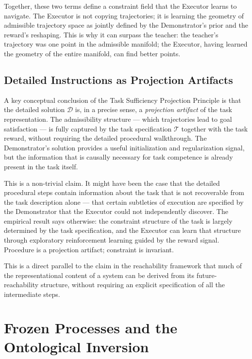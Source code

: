 \documentclass[12pt, a4paper]{article}
\theoremstyle{plain}
\theoremstyle{definition}
\theoremstyle{remark}
\begin{document}
Together, these two terms define a constraint field that the Executor learns
to navigate. The Executor is not copying trajectories; it is learning the
geometry of admissible trajectory space as jointly defined by the Demonstrator's
prior and the reward's reshaping. This is why it can surpass the teacher: the
teacher's trajectory was one point in the admissible manifold; the Executor,
having learned the geometry of the entire manifold, can find better points.

\subsection{Detailed Instructions as Projection Artifacts}

A key conceptual conclusion of the Task Sufficiency Projection Principle is
that the detailed solution $\mathcal{D}$ is, in a precise sense, a
\emph{projection artifact} of the task representation. The admissibility
structure --- which trajectories lead to goal satisfaction --- is fully
captured by the task specification $\mathcal{T}$ together with the task reward,
without requiring the detailed procedural walkthrough. The Demonstrator's
solution provides a useful initialization and regularization signal, but the
information that is causally necessary for task competence is already present
in the task itself.

This is a non-trivial claim. It might have been the case that the detailed
procedural steps contain information about the task that is not recoverable
from the task description alone --- that certain subtleties of execution are
specified by the Demonstrator that the Executor could not independently
discover. The empirical result says otherwise: the constraint structure of the
task is largely determined by the task specification, and the Executor can
learn that structure through exploratory reinforcement learning guided by the
reward signal. Procedure is a projection artifact; constraint is invariant.

This is a direct parallel to the claim in the reachability framework
\cite{flyxion2026reachability} that much of the representational content of
a system can be derived from its future-reachability structure, without
requiring an explicit specification of all the intermediate steps.

\section{Frozen Processes and the Ontological Inversion}
\end{document}
